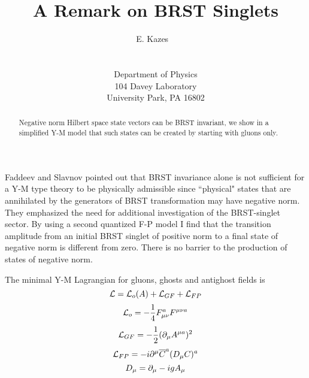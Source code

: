 \documentclass[a4paper,12pt]{article}
\begin{document}
\title{A Remark on BRST Singlets}
\author{E. Kazes
~\\~\\~\\
Department of Physics\\
104 Davey Laboratory\\
University Park, PA 16802}
\maketitle
\begin{abstract}
Negative norm Hilbert space state vectors can be BRST invariant, we show in a simplified Y-M model that such states can be created by starting with gluons only. 
\end{abstract}

\newpage
\addtolength{\baselineskip}{\baselineskip}

Faddeev and Slavnov\cite {fs} pointed out that BRST\cite{brs,tl} invariance alone is not sufficient for a Y-M type theory to be physically admissible since ``physical" states that are annihilated by the generators of BRST transformation may have negative norm.  They emphasized the need for additional investigation of the BRST-singlet sector.  By using a second quantized F-P\cite{fp} model I find that the transition amplitude from an initial BRST singlet of positive norm to a final state of negative norm is different from zero.  There is no barrier to the production of states of negative norm.


The minimal Y-M Lagrangian for gluons, ghosts and antighost fields is
\begin{equation}
{\cal L} = {\cal L}_{o}(A)+{\cal L}_{GF}+{\cal L}_{FP}\\
\end{equation}
\begin{equation}
{\cal L}_{o}=-\frac{1}{4}F^{a}_{\mu\nu}F^{\mu \nu a}\\
\end{equation}
\begin{equation}
{\cal L}_{GF}=-\frac{1}{2}(\partial_{\mu}A^{\mu a})^2\\
\end{equation}
\begin{equation}
{\cal L}_{FP} = - i \partial^{\mu} \overline{C}^{a} (D_{\mu}C)^a\\
\end{equation}
\begin{equation}
D_{\mu} = \partial_{\mu} - i g A_{\mu}\\
\end{equation}
\end{document}
